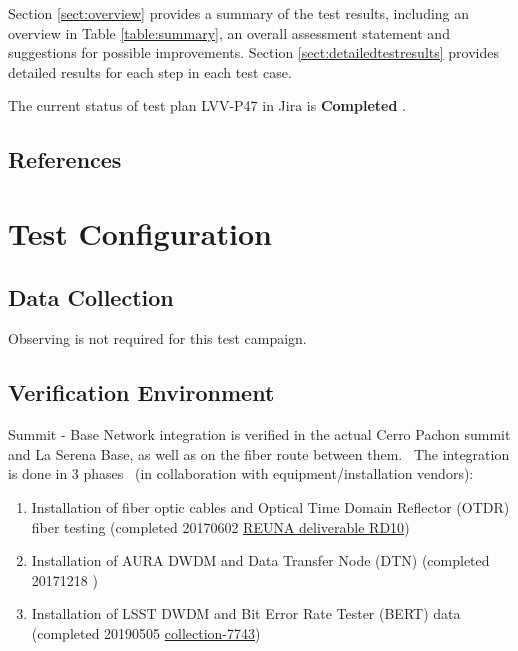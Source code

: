 \documentclass[DM,lsstdraft,STR,toc]{lsstdoc}
\providecommand{\tightlist}{
  \setlength{\itemsep}{0pt}\setlength{\parskip}{0pt}}
\begin{document}
Section \ref{sect:overview} provides a summary of the test results, including an overview in Table \ref{table:summary}, an overall assessment statement and suggestions for possible improvements.
Section \ref{sect:detailedtestresults} provides detailed results for each step in each test case.

The current status of test plan LVV-P47 in Jira is \textbf{ Completed }.

\subsection{References}
\label{sect:references}
\renewcommand{\refname}{}

\section{Test Configuration}
\label{sect:configuration}

\subsection{Data Collection}

  Observing is not required for this test campaign.

\subsection{Verification Environment}
\label{sect:hwconf}
  Summit - Base Network integration is verified in the actual Cerro Pachon
summit and La Serena Base, as well as on the fiber route between them.
~The integration is done in 3 phases ~(in collaboration with
equipment/installation vendors):

\begin{enumerate}
\tightlist
\item
  Installation of fiber optic cables and Optical Time Domain Reflector
  (OTDR) fiber testing (completed 20170602
  \href{https://docushare.lsstcorp.org/docushare/dsweb/Get/Document-26270/RD10\%20Report\%20of\%20delivery\%20of\%20LS\%20-\%20AG\%20fiber\%20from\%20Telefonica\%20to\%20REUNA.pdf}{REUNA
  deliverable RD10})
\item
  Installation of AURA DWDM and Data Transfer Node (DTN) (completed
  20171218 )
\item
  Installation of LSST DWDM and Bit Error Rate Tester (BERT) data
  (completed 20190505
  \href{https://docushare.lsstcorp.org/docushare/dsweb/View/Collection-7743}{collection-7743})
\end{enumerate}
\end{document}
